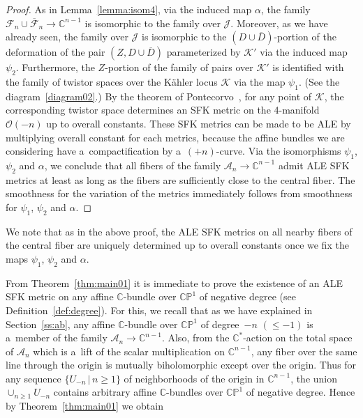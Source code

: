 \documentclass[pdftex]{sigma}
\numberwithin{equation}{section}
\begin{document}
\begin{proof}
As in Lemma~\ref{lemma:isom4}, via the induced map $\alpha$, the family $\mathscr F_n\cup\overline{\mathscr
F}_n\to\mathbb{C}^{n-1}$ is isomorphic to the family over $\mathscr J$.
Moreover, as we have already seen, the family over $\mathscr J$ is isomorphic to the $(D\cup\overline D)$-portion of the
deformation of the pair $(Z,D\cup\overline D)$ parameterized by $\mathscr K'$ via the induced map $\psi_2$.
Furthermore, the $Z$-portion of the family of pairs over $\mathscr K'$ is identif\/ied with the family of twistor spaces
over the K\"ahler locus $\mathscr K$ via the map $\psi_1$.
(See the diagram~\eqref{diagram02}.) By the theorem of Pontecorvo~\cite{Pont92}, for any point of $\mathscr K$, the
corresponding twistor space determines an SFK metric on the 4-manifold $\mathscr O(-n)$ up to overall constants.
These SFK metrics can be made to be ALE by multiplying overall constant for each metrics, because the af\/f\/ine bundles
we are considering have a~compactif\/ication by a~$(+n)$-curve.
Via the isomorphisms $\psi_1$, $\psi_2$ and $\alpha$, we conclude that all f\/ibers of the family $\mathscr
A_n\to\mathbb{C}^{n-1}$ admit ALE SFK metrics at least as long as the f\/ibers are suf\/f\/iciently close to the central f\/iber.
The smoothness for the variation of the metrics immediately follows from smoothness for $\psi_1$, $\psi_2$ and $\alpha$.
\end{proof}

We note that as in the above proof, the ALE SFK metrics on all nearby f\/ibers of the central f\/iber are uniquely
determined up to overall constants once we f\/ix the maps $\psi_1$, $\psi_2$ and $\alpha$.

From Theorem~\ref{thm:main01} it is immediate to prove the existence of an ALE SFK metric on any af\/f\/ine
$\mathbb{C}$-bundle over $\mathbb{CP}^1$ of negative degree (see Def\/inition~\ref{def:degree}).
For this, we recall that as we have explained in Section~\ref{ss:ab}, any af\/f\/ine $\mathbb{C}$-bundle over
$\mathbb{CP}^1$ of degree~$-n$ $({\le}-1)$ is a~member of the family $\mathscr A_{n}\to\mathbb{C}^{n-1}$.
Also, from the $\mathbb{C}^*$-action on the total space of $\mathscr A_n$ which is a~lift of the scalar multiplication
on $\mathbb{C}^{n-1}$, any f\/iber over the same line through the origin is mutually biholomorphic except over the
origin.
Thus for any sequence $\{U_{-n}\,|\, n\ge 1\}$ of neighborhoods of the origin in $\mathbb{C}^{n-1}$, the union
$\cup_{n\ge 1} U_{-n}$ contains arbitrary af\/f\/ine $\mathbb{C}$-bundles over $\mathbb{CP}^1$ of negative degree.
Hence by Theorem~\ref{thm:main01} we obtain
\end{document}
